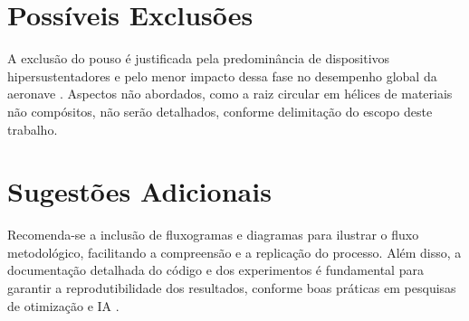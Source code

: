 \section{Possíveis Exclusões}
A exclusão do pouso é justificada pela predominância de dispositivos hipersustentadores e pelo menor impacto dessa fase no desempenho global da aeronave \cite{raymer2018aircraft, abbott1959theory}. Aspectos não abordados, como a raiz circular em hélices de materiais não compósitos, não serão detalhados, conforme delimitação do escopo deste trabalho.

\section{Sugestões Adicionais}
Recomenda-se a inclusão de fluxogramas e diagramas para ilustrar o fluxo metodológico, facilitando a compreensão e a replicação do processo. Além disso, a documentação detalhada do código e dos experimentos é fundamental para garantir a reprodutibilidade dos resultados, conforme boas práticas em pesquisas de otimização e IA \cite{goodfellow2016deep, oliveira2023}.
